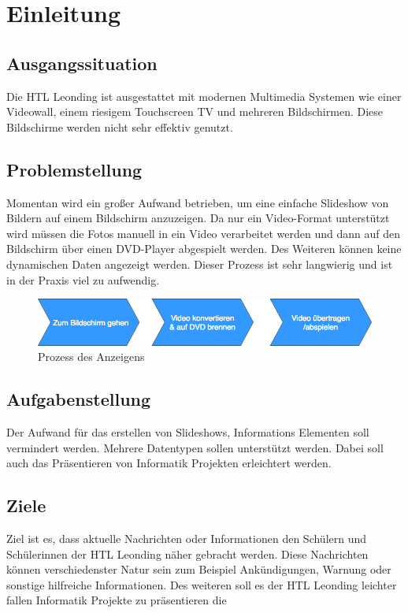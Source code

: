 \chapter{Einleitung}
\section{Ausgangssituation}
Die HTL Leonding ist ausgestattet mit modernen Multimedia Systemen wie einer Videowall, einem riesigem Touchscreen TV und mehreren Bildschirmen. Diese Bildschirme werden nicht sehr effektiv genutzt.

\section{Problemstellung}
Momentan wird ein großer Aufwand betrieben, um eine einfache Slideshow von Bildern auf einem Bildschirm anzuzeigen. Da nur ein Video-Format unterstützt wird müssen die Fotos manuell in ein Video verarbeitet werden und dann auf den Bildschirm über einen DVD-Player abgespielt werden. Des Weiteren können keine dynamischen Daten angezeigt werden. Dieser Prozess ist sehr langwierig und ist in der Praxis viel zu aufwendig.

\begin{figure}[h]
\centering
\includegraphics[width=1\textwidth]{images/01_Introduction/WayToDisplay.png}
\caption{Prozess des Anzeigens}
\label{img:processofshow}
\end{figure}

\section{Aufgabenstellung}
Der Aufwand für das erstellen von Slideshows, Informations Elementen soll vermindert werden. Mehrere Datentypen sollen unterstützt werden. Dabei soll auch das Präsentieren von Informatik Projekten erleichtert werden.

\section{Ziele}
Ziel ist es, dass aktuelle Nachrichten oder Informationen den Schülern und Schülerinnen der HTL Leonding näher gebracht werden. Diese Nachrichten können verschiedenster Natur sein zum Beispiel Ankündigungen, Warnung oder sonstige hilfreiche Informationen. Des weiteren soll es der HTL Leonding leichter fallen Informatik Projekte zu präsentieren die 
